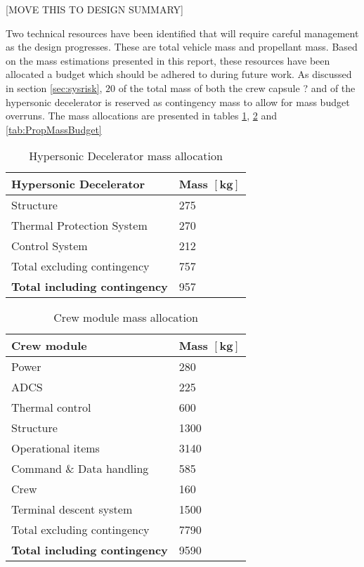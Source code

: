 [MOVE THIS TO DESIGN SUMMARY]

Two technical resources have been identified that will require careful management as the design progresses. These are total vehicle mass and propellant mass. Based on the mass estimations presented in this report, these resources have been allocated a budget which should be adhered to during future work. As discussed in section \ref{sec:sysrisk},  $20$ of the total mass of both the crew capsule ? and of the hypersonic decelerator is reserved as contingency mass to allow for mass budget overruns. The mass allocations are presented in tables \ref{tab:HDMassBudget},  \ref{tab:CMMassBudget} and \ref{tab:PropMassBudget} 

\begin{table}[ht]
	\centering
	\caption{Hypersonic Decelerator mass allocation}
	\label{tab:HDMassBudget}
	\begin{tabular}{|l|l|} \hline
		\textbf {Hypersonic Decelerator}             & \textbf{Mass $\mathbf{[kg]}$ } \\ \hline \hline
		Structure          &		 275       \\ \hline
		Thermal Protection System &		  270      \\ \hline
		Control System            		   &  212      \\ \hline \hline
		Total excluding contingency              	   &  757     \\ \hline
		\textbf {Total including contingency}                 &  957      \\ \hline
	\end{tabular}
\end{table}

\begin{table}[ht]
	\centering
	\caption{Crew module mass allocation}
	\label{tab:CMMassBudget}
	\begin{tabular}{|l|l|} \hline
		\textbf {Crew module}             & \textbf{Mass $\mathbf{[kg]}$ } \\ \hline \hline
		Power        &		 280       \\ \hline
		ADCS &		  225      \\ \hline
		Thermal control & 600\\ \hline
		Structure & 1300\\ \hline
		Operational items & 3140\\ \hline
		Command \& Data handling & 585 \\ \hline
		Crew & 160 \\ \hline
		Terminal descent system           		   &  1500      \\ \hline \hline
		Total excluding contingency              	   &  7790     \\ \hline
		\textbf {Total including contingency}                 &  9590      \\ \hline
	\end{tabular}
\end{table}

